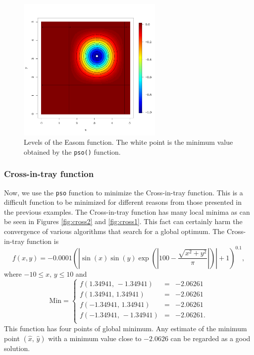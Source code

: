\documentclass[10pt,letterpaper]{article}
\begin{document}
\begin{figure}[H]
\centering
\includegraphics[width=7cm,height=7cm]{curve_easom}
\caption{Levels of the Easom function.
The white point is the minimum value obtained by the \texttt{pso()} function.}
\label{curves_easom}
\end{figure}

\subsubsection{Cross-in-tray function}

Now, we use the \texttt{pso} function to minimize the Cross-in-tray function.
This is a difficult function to be minimized for different reasons from
those presented in the previous examples.
The Cross-in-tray function has many local minima as  can be seen in Figures \ref{fig:cross2}
and \ref{fig:cross1}.
This fact can certainly harm the convergence of various algorithms that search for a global optimum.
The Cross-in-tray function is
$$f(x,y) = -0.0001 \left(\left| \sin(x) \sin(y) \exp\left({\left|100 - \frac{\sqrt{x^2 + y^2}}{\pi}\right|}\right)\right| +1 \right)^{0.1},$$
where $-10 \leq x,\, y \leq 10$ and
$$
\mathrm{Min} = \left\{
\begin{array}{ccc}
f(1.34941,\,-1.34941) & = & -2.06261
\\
f(1.34941,\,1.34941) & = & -2.06261
\\
f(-1.34941,\,1.34941) & = & -2.06261
\\
f(-1.34941,\,-1.34941) & = & -2.06261.
\\
\end{array}
\right.
$$
This function has four points of global minimum.
Any estimate of the minimum point $(\widehat{x},\,\widehat{y})$ with a minimum value close to $-2.0626$ can be regarded as a good solution.
\end{document}
